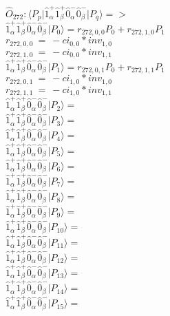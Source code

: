 \documentclass[14pt]{article}
\begin{document}
    $\hat{O}_{272}:  \langle{P_p}\vert \hat{1}_{\alpha}^{+}\hat{1}_{\beta}^{+}\hat{0}_{\alpha}^{-}\hat{0}_{\beta}^{-} \vert{P_q}\rangle => $ \\ 
    $ \hat{1}_{\alpha}^{+}\hat{1}_{\beta}^{+}\hat{0}_{\alpha}^{-}\hat{0}_{\beta}^{-} \vert{P_{0}}\rangle = {r}_{272,0,0}P_{0}+{r}_{272,1,0}P_{1} $ \\ 
    ${r}_{272,0,0}\ =\ -{ci}_{0,0}*{inv}_{1,0} $ \\ 
    ${r}_{272,1,0}\ =\ -{ci}_{0,0}*{inv}_{1,1} $ \\ 
    $ \hat{1}_{\alpha}^{+}\hat{1}_{\beta}^{+}\hat{0}_{\alpha}^{-}\hat{0}_{\beta}^{-} \vert{P_{1}}\rangle = {r}_{272,0,1}P_{0}+{r}_{272,1,1}P_{1} $ \\ 
    ${r}_{272,0,1}\ =\ -{ci}_{1,0}*{inv}_{1,0} $ \\ 
    ${r}_{272,1,1}\ =\ -{ci}_{1,0}*{inv}_{1,1} $ \\ 
    $ \hat{1}_{\alpha}^{+}\hat{1}_{\beta}^{+}\hat{0}_{\alpha}^{-}\hat{0}_{\beta}^{-} \vert{P_{2}}\rangle =  $ \\ 
    $ \hat{1}_{\alpha}^{+}\hat{1}_{\beta}^{+}\hat{0}_{\alpha}^{-}\hat{0}_{\beta}^{-} \vert{P_{3}}\rangle =  $ \\ 
    $ \hat{1}_{\alpha}^{+}\hat{1}_{\beta}^{+}\hat{0}_{\alpha}^{-}\hat{0}_{\beta}^{-} \vert{P_{4}}\rangle =  $ \\ 
    $ \hat{1}_{\alpha}^{+}\hat{1}_{\beta}^{+}\hat{0}_{\alpha}^{-}\hat{0}_{\beta}^{-} \vert{P_{5}}\rangle =  $ \\ 
    $ \hat{1}_{\alpha}^{+}\hat{1}_{\beta}^{+}\hat{0}_{\alpha}^{-}\hat{0}_{\beta}^{-} \vert{P_{6}}\rangle =  $ \\ 
    $ \hat{1}_{\alpha}^{+}\hat{1}_{\beta}^{+}\hat{0}_{\alpha}^{-}\hat{0}_{\beta}^{-} \vert{P_{7}}\rangle =  $ \\ 
    $ \hat{1}_{\alpha}^{+}\hat{1}_{\beta}^{+}\hat{0}_{\alpha}^{-}\hat{0}_{\beta}^{-} \vert{P_{8}}\rangle =  $ \\ 
    $ \hat{1}_{\alpha}^{+}\hat{1}_{\beta}^{+}\hat{0}_{\alpha}^{-}\hat{0}_{\beta}^{-} \vert{P_{9}}\rangle =  $ \\ 
    $ \hat{1}_{\alpha}^{+}\hat{1}_{\beta}^{+}\hat{0}_{\alpha}^{-}\hat{0}_{\beta}^{-} \vert{P_{10}}\rangle =  $ \\ 
    $ \hat{1}_{\alpha}^{+}\hat{1}_{\beta}^{+}\hat{0}_{\alpha}^{-}\hat{0}_{\beta}^{-} \vert{P_{11}}\rangle =  $ \\ 
    $ \hat{1}_{\alpha}^{+}\hat{1}_{\beta}^{+}\hat{0}_{\alpha}^{-}\hat{0}_{\beta}^{-} \vert{P_{12}}\rangle =  $ \\ 
    $ \hat{1}_{\alpha}^{+}\hat{1}_{\beta}^{+}\hat{0}_{\alpha}^{-}\hat{0}_{\beta}^{-} \vert{P_{13}}\rangle =  $ \\ 
    $ \hat{1}_{\alpha}^{+}\hat{1}_{\beta}^{+}\hat{0}_{\alpha}^{-}\hat{0}_{\beta}^{-} \vert{P_{14}}\rangle =  $ \\ 
    $ \hat{1}_{\alpha}^{+}\hat{1}_{\beta}^{+}\hat{0}_{\alpha}^{-}\hat{0}_{\beta}^{-} \vert{P_{15}}\rangle =  $ \\ 
    
\end{document}

